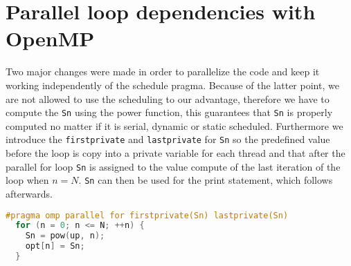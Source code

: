 \section{Parallel loop dependencies with OpenMP}
Two major changes were made in order to parallelize the code and keep it working independently of the schedule pragma. Because of the latter point, we are not allowed to use the scheduling to our advantage, therefore we have to compute the \texttt{Sn} using the power function, this guarantees that \texttt{Sn} is properly computed no matter if it is serial, dynamic or static scheduled.\newline
Furthermore we introduce the \texttt{firstprivate} and \texttt{lastprivate} for \texttt{Sn} so the predefined value before the loop is copy into a private variable for each thread and that after the parallel for loop \texttt{Sn} is assigned  to the value compute of the last iteration of the loop when $n=N$. \texttt{Sn} can then be used for the print statement, which follows afterwards. 
\begin{lstlisting}[language=C++, caption=Parallelized section of recur\_omp.c, label=lst:ldp]
#pragma omp parallel for firstprivate(Sn) lastprivate(Sn)
  for (n = 0; n <= N; ++n) {
    Sn = pow(up, n);
    opt[n] = Sn;
  }
\end{lstlisting}


